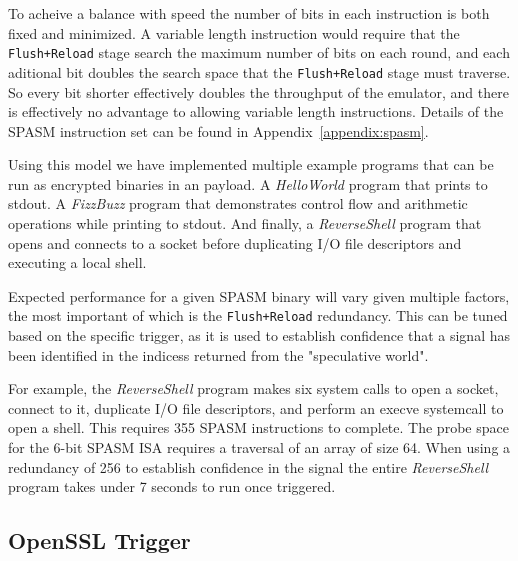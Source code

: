 To acheive a balance with speed the number of bits in each instruction is both 
fixed and minimized.  A variable length instruction would require that the 
\texttt{Flush+Reload} stage search the maximum number of bits on each round, and each 
aditional bit doubles the search space that the \texttt{Flush+Reload} stage must 
traverse.  So every bit shorter effectively doubles the throughput of the 
emulator, and there is effectively no advantage to allowing variable length 
instructions. Details of the SPASM instruction set can be found in 
Appendix~\ref{appendix:spasm}. 

Using this model we have implemented multiple example programs that can be run
as encrypted binaries in an \speculake payload. A \textit{HelloWorld} program 
that prints to stdout. A \textit{FizzBuzz} program that demonstrates control 
flow and arithmetic operations while printing to stdout. And finally,
a \textit{ReverseShell} program that opens and connects to a socket before  
duplicating I/O file descriptors and executing a local shell. 

Expected performance for a given SPASM binary will vary given multiple factors, 
the most important of which is the \texttt{Flush+Reload} redundancy. This can be tuned
based on the specific trigger, as it is used to establish confidence that a signal 
has been identified in the indicess returned from the "speculative world". 


For example, the \textit{ReverseShell} program makes six system calls to open a socket,
connect to it, duplicate I/O file descriptors, and perform an execve
systemcall to open a shell. This requires 355 SPASM instructions to complete. 
The probe space for the 6-bit SPASM ISA requires a traversal of an array of size 64.
When using a redundancy of 256 to establish confidence in the signal the entire 
\textit{ReverseShell} program takes under 7 seconds to run once triggered. 



\FigSpasmModel

\subsection{OpenSSL Trigger}
\label{subsec:openssl}

